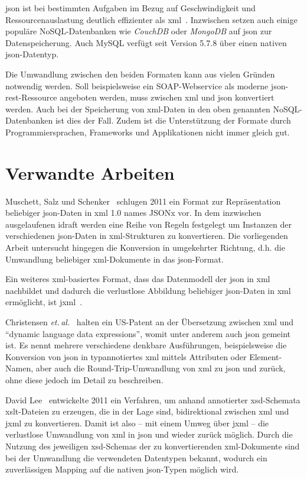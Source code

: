 \acrshort{json} ist bei bestimmten Aufgaben im Bezug auf Geschwindigkeit und
Ressourcenauslastung deutlich effizienter als \acrshort{xml}~\cite{nurseitov2009comparison}\@.
Inzwischen setzen auch einige populäre NoSQL-Datenbanken wie
\emph{CouchDB} oder \emph{MongoDB} auf \acrshort{json} zur Datenspeicherung. Auch
MySQL verfügt seit Version 5.7.8 über einen nativen \acrshort{json}-Datentyp.

Die Umwandlung zwischen den beiden Formaten kann aus vielen Gründen
notwendig werden. Soll beispielsweise ein SOAP-Webservice als moderne
\acrshort{json}-\acrshort{rest}-Ressource angeboten werden, muss zwischen \acrshort{xml} und \acrshort{json} konvertiert
werden. Auch bei der Speicherung von \acrshort{xml}-Daten in den oben genannten NoSQL-Datenbanken
ist dies der Fall. Zudem ist die Unterstützung der Formate durch
Programmiersprachen, Frameworks und Applikationen nicht immer gleich gut.

\section{Verwandte Arbeiten}

Muschett, Salz und Schenker~\cite{jsonx} schlugen 2011 ein Format zur Repräsentation beliebiger \acrshort{json}-Daten in \acrshort{xml} 1.0 names JSONx vor. In dem inzwischen ausgelaufenen \gls{idraft} werden eine Reihe von Regeln festgelegt um Instanzen der verschiedenen \acrshort{json}-Daten in \acrshort{xml}-Strukturen zu konvertieren. Die vorliegenden Arbeit untersucht hingegen die Konversion in umgekehrter Richtung, d.h. die Umwandlung beliebiger \acrshort{xml}-Dokumente in das \acrshort{json}-Format.

Ein weiteres \acrshort{xml}-basiertes Format, dass das Datenmodell der \acrfull{json} in \acrshort{xml} nachbildet und dadurch die verlustlose Abbildung beliebiger \acrshort{json}-Daten in \acrshort{xml} ermöglicht, ist \gls{jxml}~\cite{jxml}.

Christensen \emph{et.\,al.}~\cite{US7761484} halten ein US-Patent an der Übersetzung zwischen \acrshort{xml} und \enquote{dynamic language data expressions}, womit unter anderem auch \acrshort{json} gemeint ist. Es nennt mehrere verschiedene denkbare Ausführungen, beispielsweise die Konversion von \acrshort{json} in typannotiertes \acrshort{xml} mittels Attributen oder Element-Namen, aber auch die Round-Trip-Umwandlung von \acrshort{xml} zu \acrshort{json} und zurück, ohne diese jedoch im Detail zu beschreiben.

David Lee~\cite{lee2011jxon} entwickelte 2011 ein Verfahren, um anhand annotierter \acrshort{xsd}-Schemata \acrshort{xslt}-Dateien zu erzeugen, die in der Lage sind, bidirektional zwischen \acrshort{xml} und \gls{jxml} zu konvertieren.  Damit ist also -- mit einem Umweg über \gls{jxml} -- die verlustlose Umwandlung von \acrshort{xml} in \acrshort{json} und wieder zurück möglich.
Durch die Nutzung des jeweiligen \acrshort{xsd}-Schemas der zu konvertierenden \acrshort{xml}-Dokumente sind bei der Umwandlung die verwendeten Datentypen bekannt, wodurch ein zuverlässigen Mapping auf die nativen \acrshort{json}-Typen möglich wird.

